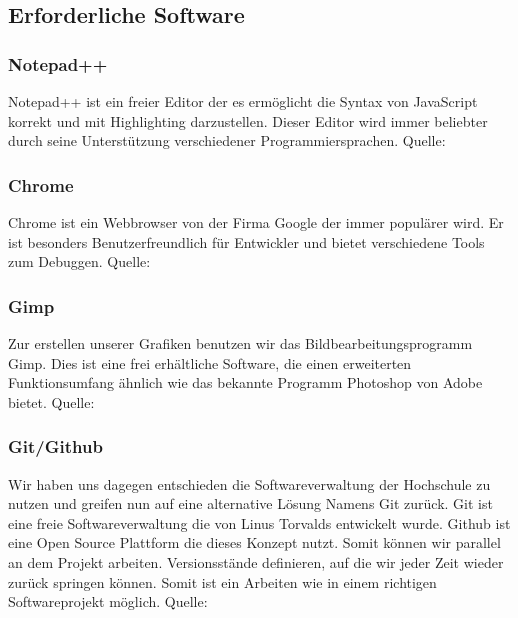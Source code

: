 \subsection{Erforderliche Software}
\subsubsection{Notepad++}
Notepad++ ist ein freier Editor der es ermöglicht die Syntax von JavaScript korrekt und mit Highlighting darzustellen. Dieser Editor wird immer beliebter durch seine Unterstützung verschiedener Programmiersprachen. Quelle: \cite{notepad}
\subsubsection{Chrome}
Chrome ist ein Webbrowser von der Firma Google der immer populärer wird. Er ist besonders Benutzerfreundlich für Entwickler und bietet verschiedene Tools zum Debuggen. Quelle: \cite{chrome}
\subsubsection{Gimp}
Zur erstellen unserer Grafiken benutzen wir das Bildbearbeitungsprogramm Gimp. Dies ist eine frei erhältliche Software, die einen erweiterten Funktionsumfang ähnlich wie das bekannte Programm Photoshop von Adobe bietet. Quelle: \cite{gimp}
\subsubsection{Git/Github}
Wir haben uns dagegen entschieden die Softwareverwaltung der Hochschule zu nutzen und greifen nun auf eine alternative Lösung Namens Git zurück. Git ist eine freie Softwareverwaltung die von Linus Torvalds entwickelt wurde. Github ist eine Open Source Plattform die dieses Konzept nutzt. Somit können wir parallel an dem Projekt arbeiten. Versionsstände definieren, auf die wir jeder Zeit wieder zurück springen können. Somit ist ein Arbeiten wie in einem richtigen Softwareprojekt möglich. Quelle: \cite{git}
